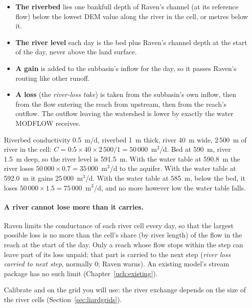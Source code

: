 \begin{itemize}
\item \textbf{The riverbed} lies one bankfull depth of Raven's channel (at its reference flow) below the lowest DEM value
along the river in the cell, or  metres below it.
\item \textbf{The river level} each day is the bed plus Raven's channel depth at the start of the day, never above the
land surface.
\item \textbf{A gain} is added to the subbasin's inflow for the day, so it passes Raven's routing like other runoff.
\item \textbf{A loss} (the \emph{river-loss take}) is taken from the subbasin's own inflow, then from the flow entering the
reach from upstream, then from the reach's outflow. The outflow leaving the watershed is lower by exactly the water
MODFLOW receives.
\end{itemize}
\begin{example}
Riverbed conductivity 0.5~m/d, riverbed 1~m thick, river 40~m wide, 2\,500~m of river in the cell:
$C=0.5\times40\times2\,500/1=50\,000$~m$^2$/d. Bed at 590~m, river 1.5~m deep, so the river level is 591.5~m.
With the water table at 590.8~m the river loses $50\,000\times0.7=35\,000$~m$^3$/d to the aquifer. With the water table
at 592.0~m it gains 25\,000~m$^3$/d. With the water table at 585~m, below the bed, it loses
$50\,000\times1.5=75\,000$~m$^3$/d, and no more however low the water table falls.
\end{example}

\paragraph{A river cannot lose more than it carries.} Raven limits the conductance of each river cell every day, so that
the largest possible loss is no more than the cell's share (by river length) of the flow in the reach at the start of
the day. Only a reach whose flow stops within the step can leave part of its loss unpaid; that part is carried to the next
step (\emph{river loss carried to next step}, normally 0; Raven warns). An existing model's stream package has no such
limit (Chapter~\ref{uch:existing}).

\begin{inpractice}
Calibrate  and  on the grid you will use: the river exchange depends on the size of the
river cells (Section~\ref{sec:liardgrids}).
\end{inpractice}

